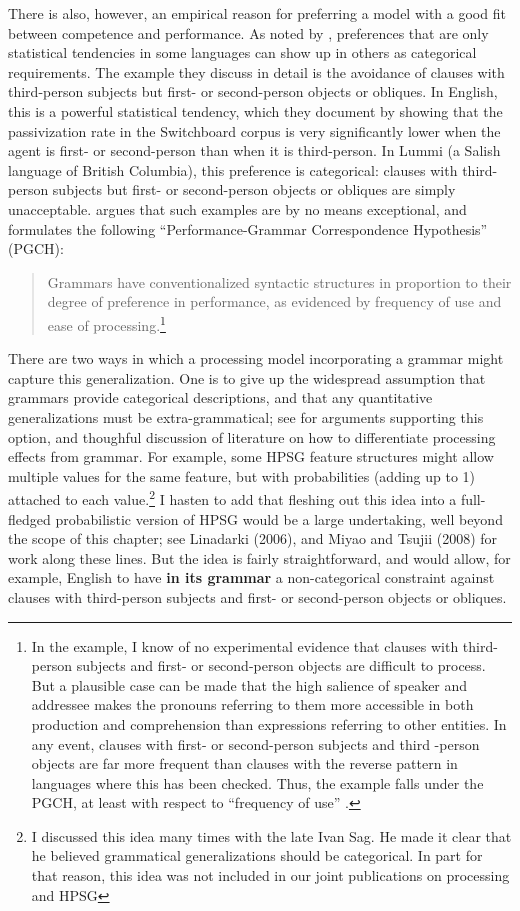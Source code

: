 \documentclass[a4paper]{article}
\begin{document}
There is also, however, an empirical reason for preferring a model with a good fit between competence and performance.  As noted by \citet{BresnanEtAl2001}, preferences that are only statistical tendencies in some languages can show up in others as categorical requirements.  The example they discuss in detail is the avoidance of clauses with third-person subjects but first- or second-person objects or obliques. In English, this is a powerful statistical tendency, which they document by showing that the passivization rate in the Switchboard corpus is very significantly lower when the agent is first- or second-person than when it is third-person.  In Lummi (a Salish language of British Columbia), this preference is categorical:  clauses with third-person subjects but first- or second-person objects or obliques are simply unacceptable.  \citet{Hawkins2004a-u,Hawkins2014} argues that such examples are by no means exceptional, and formulates the following ``Performance-Grammar Correspondence Hypothesis'' (PGCH):
\begin{quote}
Grammars  have  conventionalized  syntactic  structures  in  proportion   to their degree of preference in performance, as evidenced by frequency of use and ease of processing.\footnote {In the \citeauthor{BresnanEtAl2001} example, I know of no experimental evidence that clauses with third-person subjects and first- or second-person objects are difficult to process.  But a plausible case can be made that the high salience of speaker and addressee makes the pronouns referring to them more accessible in both production and comprehension than expressions referring to other entities.  In any event, clauses with first- or second-person subjects and third -person objects are far more frequent than clauses with the reverse pattern in languages where this has been checked.  Thus, the \citeauthor{BresnanEtAl2001} example falls under the PGCH, at least with respect to ``frequency of use'' .}
\end{quote}
There are two ways in which a processing model incorporating a grammar might capture this generalization.  One is to give up the widespread assumption that grammars provide categorical descriptions, and that any quantitative generalizations must be extra-grammatical; see \citet{FrancisPrep} for arguments supporting this option, and thoughful discussion of literature on how to differentiate processing effects from grammar.  For example, some HPSG feature structures might allow multiple values for the same feature, but with probabilities (adding up to 1) attached to each value.\footnote{I discussed this idea many times with the late Ivan Sag.  He made it clear that he believed grammatical generalizations should be categorical.  In part for that reason, this idea was not included in our joint publications on processing and HPSG}  I hasten to add that fleshing out this idea into a full-fledged probabilistic version of HPSG would be a large undertaking, well beyond the scope of this chapter; see Linadarki (2006), and Miyao and Tsujii (2008) for work along these lines.  But the idea is fairly straightforward, and would allow, for example, English to have {\bf in its grammar} a non-categorical constraint against clauses with third-person subjects and first- or second-person objects or obliques.  
\end{document}
